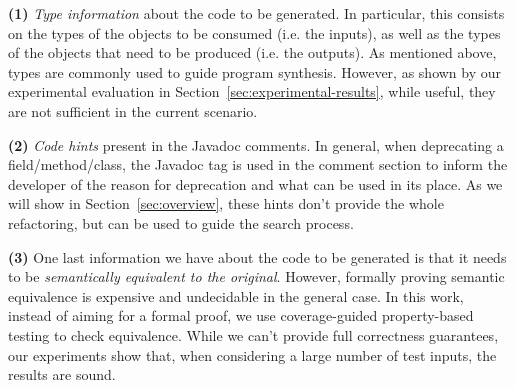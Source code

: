 \documentclass[sigconf,review,anonymous]{acmart}
\begin{document}
{\bf (1)} {\em Type information} about the code to be generated. In particular, this consists on the types of the objects to be consumed (i.e. the inputs), as well as the types of the objects that need to be produced (i.e. the outputs). As mentioned above, types are commonly used to guide  program synthesis. However, as shown by our experimental evaluation in Section~\ref{sec:experimental-results}, while useful, they are not sufficient in the current scenario. %

{\bf (2)} {\em Code hints} present in the Javadoc comments. In general, when deprecating a field/method/class, the  Javadoc tag is used in the
  comment section to inform the developer of the reason for deprecation and what can be used in its place. As we will show in Section~\ref{sec:overview}, these hints
  don't provide the whole refactoring, but can be used to guide the search process.

  {\bf (3)} One last information we have about the code to be generated is that it needs to be {\em semantically equivalent to the original}. %
  However, formally proving semantic equivalence is expensive and undecidable in the general case. %
In this work, instead of aiming for a formal proof,  we use coverage-guided property-based testing to check equivalence. %
While we can't provide full correctness guarantees,
our experiments show that, when considering a large number of test inputs, the results are sound.

\end{document}
